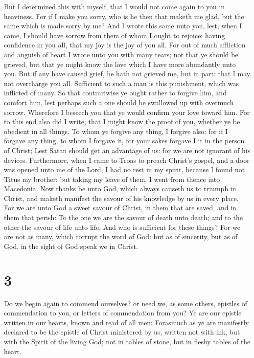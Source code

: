  But I determined this with myself, that I would not come
again to you in heaviness.  For if I make you sorry, who
is he then that maketh me glad, but the same which is made sorry by me?
 And I wrote this same unto you, lest, when I came, I
should have sorrow from them of whom I ought to rejoice; having
confidence in you all, that my joy is the joy of you all. 
For out of much affliction and anguish of heart I wrote unto you with
many tears; not that ye should be grieved, but that ye might know the
love which I have more abundantly unto you.  But if any
have caused grief, he hath not grieved me, but in part: that I may not
overcharge you all.  Sufficient to such a man is this
punishment, which was inflicted of many.  So that
contrariwise ye ought rather to forgive him, and comfort him, lest
perhaps such a one should be swallowed up with overmuch sorrow.
 Wherefore I beseech you that ye would confirm your love
toward him.  For to this end also did I write, that I
might know the proof of you, whether ye be obedient in all things.
 To whom ye forgive any thing, I forgive also: for if I
forgave any thing, to whom I forgave it, for your sakes forgave I it in
the person of Christ;  Lest Satan should get an advantage
of us: for we are not ignorant of his devices. 
Furthermore, when I came to Troas to preach Christ's gospel, and a door
was opened unto me of the Lord,  I had no rest in my
spirit, because I found not Titus my brother: but taking my leave of
them, I went from thence into Macedonia.  Now thanks be
unto God, which always causeth us to triumph in Christ, and maketh
manifest the savour of his knowledge by us in every place.
 For we are unto God a sweet savour of Christ, in them
that are saved, and in them that perish:  To the one we
are the savour of death unto death; and to the other the savour of life
unto life. And who is sufficient for these things?  For
we are not as many, which corrupt the word of God: but as of sincerity,
but as of God, in the sight of God speak we in Christ.

\hypertarget{section-2}{%
\section{3}\label{section-2}}

 Do we begin again to commend ourselves? or need we, as
some others, epistles of commendation to you, or letters of commendation
from you?  Ye are our epistle written in our hearts, known
and read of all men:  Forasmuch as ye are manifestly
declared to be the epistle of Christ ministered by us, written not with
ink, but with the Spirit of the living God; not in tables of stone, but
in fleshy tables of the heart.

